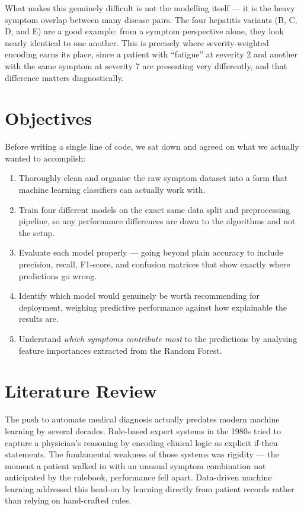 \documentclass[12pt,a4paper]{article}
\begin{document}
What makes this genuinely difficult is not the modelling itself --- it is the heavy symptom overlap between many disease pairs. The four hepatitis variants (B, C, D, and E) are a good example: from a symptom perspective alone, they look nearly identical to one another. This is precisely where severity-weighted encoding earns its place, since a patient with ``fatigue'' at severity 2 and another with the same symptom at severity 7 are presenting very differently, and that difference matters diagnostically.

\section{Objectives}

Before writing a single line of code, we sat down and agreed on what we actually wanted to accomplish:

\begin{enumerate}
    \item Thoroughly clean and organise the raw symptom dataset into a form that machine learning classifiers can actually work with.
    \item Train four different models on the exact same data split and preprocessing pipeline, so any performance differences are down to the algorithms and not the setup.
    \item Evaluate each model properly --- going beyond plain accuracy to include precision, recall, F1-score, and confusion matrices that show exactly where predictions go wrong.
    \item Identify which model would genuinely be worth recommending for deployment, weighing predictive performance against how explainable the results are.
    \item Understand \textit{which symptoms contribute most} to the predictions by analysing feature importances extracted from the Random Forest.
\end{enumerate}

\section{Literature Review}

The push to automate medical diagnosis actually predates modern machine learning by several decades. Rule-based expert systems in the 1980s tried to capture a physician's reasoning by encoding clinical logic as explicit if-then statements. The fundamental weakness of those systems was rigidity --- the moment a patient walked in with an unusual symptom combination not anticipated by the rulebook, performance fell apart. Data-driven machine learning addressed this head-on by learning directly from patient records rather than relying on hand-crafted rules.
\end{document}
